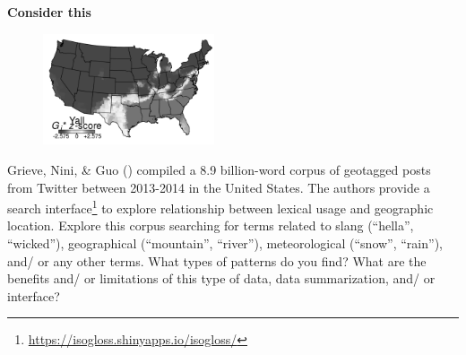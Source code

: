\documentclass[
  letterpaper,
  krantz1]{latex/krantz-mod}
\theoremstyle{definition}
\theoremstyle{definition}
\theoremstyle{remark}
\DeclareRobustCommand{\href}[2]{#2\footnote{\url{#1}}}
\begin{document}
\begin{tcolorbox}[enhanced jigsaw, leftrule=.75mm, colframe=quarto-callout-color-frame, left=2mm, colback=white, toprule=.15mm, breakable, arc=.35mm, opacityback=0, bottomrule=.15mm, rightrule=.15mm]

\textbf{ Consider this}

\begin{figure}
  \centering
  \includegraphics[width=0.45\textwidth]{part_2/figures/data-word-mapper.png}
\end{figure}

Grieve, Nini, \& Guo () compiled a 8.9
billion-word corpus of geotagged posts from Twitter between 2013-2014 in
the United States. The authors provide a
\href{https://isogloss.shinyapps.io/isogloss/}{search interface} to
explore relationship between lexical usage and geographic location.
Explore this corpus searching for terms related to slang (``hella'',
``wicked''), geographical (``mountain'', ``river''), meteorological
(``snow'', ``rain''), and/ or any other terms. What types of patterns do
you find? What are the benefits and/ or limitations of this type of
data, data summarization, and/ or interface?

\end{tcolorbox}
\end{document}
